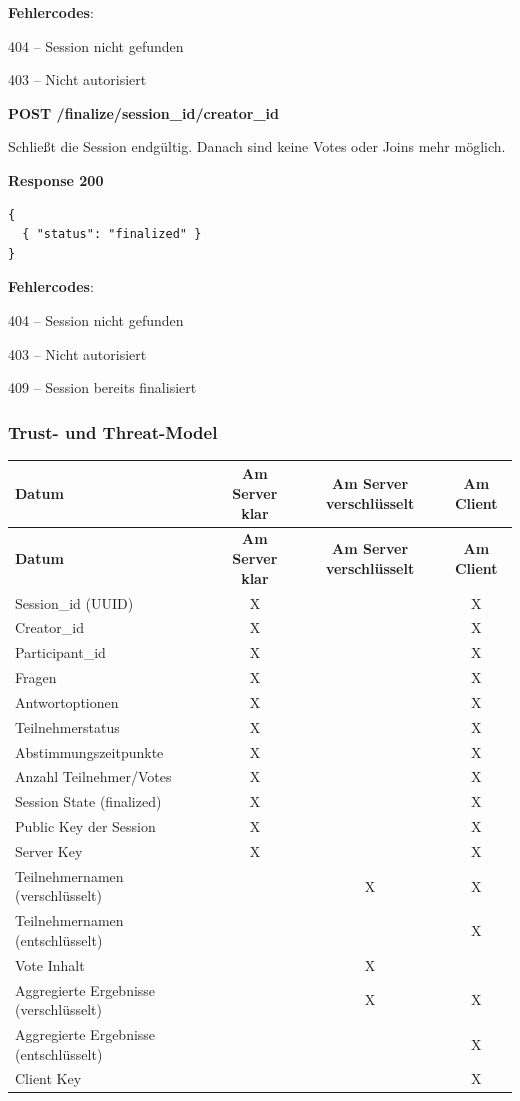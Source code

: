 \textbf{Fehlercodes}:

404 – Session nicht gefunden

403 – Nicht autorisiert

\textbf{POST /finalize/{session\_id}/{creator\_id}}

Schließt die Session endgültig. Danach sind keine Votes oder Joins mehr möglich.

\textbf{Response 200}
\begin{lstlisting}
{
  { "status": "finalized" }
}
\end{lstlisting}

\textbf{Fehlercodes}:

404 – Session nicht gefunden

403 – Nicht autorisiert

409 – Session bereits finalisiert

\subsubsection{Trust- und Threat-Model}

\begin{longtable}{|p{5cm}|c|c|c|}
\hline
\textbf{Datum} &
\textbf{Am Server klar} &
\textbf{Am Server verschlüsselt} &
\textbf{Am Client} \\
\hline
\endfirsthead

\hline
\textbf{Datum} &
\textbf{Am Server klar} &
\textbf{Am Server verschlüsselt} &
\textbf{Am Client} \\
\hline
\endhead

\hline
\endfoot

\hline
\endlastfoot

Session\_id (UUID) & X & & X \\
\hline
Creator\_id & X & & X \\
\hline
Participant\_id & X & & X \\
\hline
Fragen & X & & X \\
\hline
Antwortoptionen & X & & X \\
\hline
Teilnehmerstatus & X & & X \\
\hline
Abstimmungszeitpunkte & X & & X \\
\hline
Anzahl Teilnehmer/Votes & X & & X \\
\hline
Session State (finalized) & X & & X \\
\hline
Public Key der Session & X & & X \\
\hline
Server Key & X & & X \\
\hline
Teilnehmernamen (verschlüsselt) & & X & X \\
\hline
Teilnehmernamen (entschlüsselt) & & & X \\
\hline
Vote Inhalt & & X & \\
\hline
Aggregierte Ergebnisse (verschlüsselt) & & X & X \\
\hline
Aggregierte Ergebnisse (entschlüsselt) & & & X \\
\hline
Client Key & & & X \\
\hline

\end{longtable}

